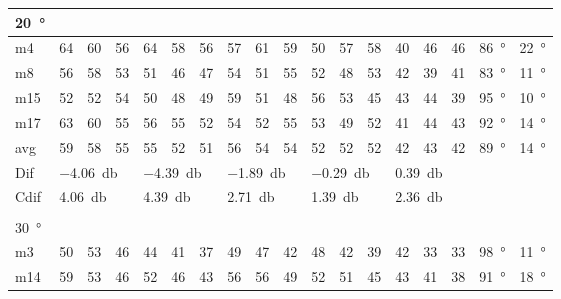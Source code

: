 \begin{table}[H]
\begin{tabular}{l|l|l|l|l|l|l|l|l|l|l|l|l|l|l|l|l|l}
\SI{20}{\degree}   & \multicolumn{3}{l|}{} & \multicolumn{3}{l|}{} & \multicolumn{3}{l|}{} & \multicolumn{3}{l|}{} & \multicolumn{3}{l|}{} &  \multicolumn{2}{l}{}   \\  \hline
m4    & 64     & 60     &  56    &   64   &  58    &  56    &   57   &   61    &  59    &  50     &   57   &  58    & 40 & 46 & 46 & \SI{86}{\degree} & \SI{22}{\degree}   \\
m8    &  56    &  58   &   53   &   51   &   46   &  47    &   54   &   51    &   55   &    52   &    48  &   53   & 42 & 39 & 41 &  \SI{83}{\degree} & \SI{11}{\degree}   \\
m15  &  52    & 52     &   54   &  50    &  48    &  49    & 59     &    51   &   48   &   56    &   53   &   45   & 43 & 44 & 39 & \SI{95}{\degree} & \SI{10}{\degree}  \\
m17  &  63    & 60     &  55    &  56    & 55     &  52    &  54    &   52    &    55  &   53    &   49   & 52     & 41 & 44 & 43 & \SI{92}{\degree} & \SI{14}{\degree}  \\ \hline
avg & 59     & 58     &  55    &  55    &  52    &  51    &  56    &   54    & 54     &    52   &   52   &  52    & 42 & 43  & 42  & \SI{89}{\degree} & \SI{14}{\degree}  \\ \hline  
Dif & \multicolumn{3}{l|}{\SI{-4.06}{\decibel}} & \multicolumn{3}{l|}{\SI{-4.39}{\decibel}} & \multicolumn{3}{l|}{\SI{-1.89}{\decibel}} & \multicolumn{3}{l|}{\SI{-0.29}{\decibel}} & \multicolumn{3}{l|}{\SI{0.39}{\decibel}} & \multicolumn{2}{l}{} \\ \hline 
Cdif & \multicolumn{3}{l|}{\SI{4.06}{\decibel}} & \multicolumn{3}{l|}{\SI{4.39}{\decibel}} & \multicolumn{3}{l|}{\SI{2.71}{\decibel}} & \multicolumn{3}{l|}{\SI{1.39}{\decibel}} & \multicolumn{3}{l|}{\SI{2.36}{\decibel}}  &   \multicolumn{2}{l}{}   \\ 
 \multicolumn{18}{l}{ } \\                             
\SI{30}{\degree}   & \multicolumn{3}{l|}{} & \multicolumn{3}{l|}{} & \multicolumn{3}{l|}{} & \multicolumn{3}{l|}{} & \multicolumn{3}{l|}{} &  \multicolumn{2}{l}{}   \\  \hline
m3    & 50     &  53    &  46    &  44    &  41    &  37    &  49    &   47    &   42   &   48    &  42    &   39   & 42 & 33 &33 & \SI{98}{\degree} & \SI{11}{\degree}   \\
m14  & 59     &  53    &  46    &  52    &   46   &  43    &  56    &  56     &  49    &   52    &   51   &   45   & 43 & 41 & 38 & \SI{91}{\degree}  & \SI{18}{\degree}  \\

\end{tabular}
\end{table}
